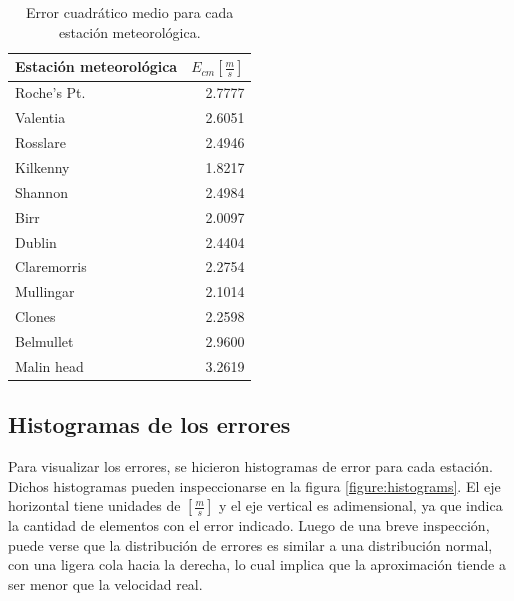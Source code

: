 \documentclass[journal, monochrome]{IEEEtran}
\begin{document}
\begin{table}
	\begin{center}
		\begin{tabular}{l|r}
			Estación meteorológica & $E_{cm} [\frac{m}{s}]$ \\
			\hline
			Roche's Pt. & 2.7777 \\ 
			Valentia & 2.6051 \\
			Rosslare & 2.4946 \\
			Kilkenny & 1.8217 \\
			Shannon & 2.4984 \\
			Birr & 2.0097 \\
			Dublin & 2.4404 \\
			Claremorris & 2.2754 \\
			Mullingar & 2.1014 \\
			Clones & 2.2598 \\
			Belmullet & 2.9600 \\
			Malin head & 3.2619 \\
		\end{tabular}
		\caption{Error cuadrático medio para cada estación meteorológica.}
		\label{table:ecm}
	\end{center}
\end{table}


\vspace{0.5cm}
\subsection{Histogramas de los errores}

Para visualizar los errores, se hicieron histogramas de error para cada estación. Dichos histogramas pueden inspeccionarse en la figura \ref{figure:histograms}. El eje horizontal tiene unidades de $[\frac{m}{s}]$ y el eje vertical es adimensional, ya que indica la cantidad de elementos con el error indicado. Luego de una breve inspección, puede verse que la distribución de errores es similar a una distribución normal, con una ligera cola hacia la derecha, lo cual implica que la aproximación tiende a ser menor que la velocidad real.
\end{document}
